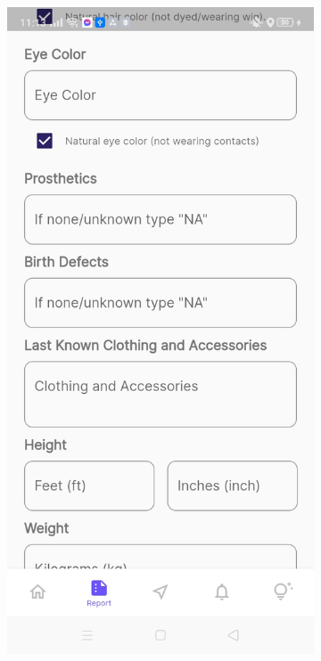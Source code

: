 \begin{figure}[!h]
\begin{subfigure}[c]{0.30\linewidth}
        \centering
        \includegraphics[scale=0.15]{figures/Chapter4/Main/p4-2.jpg}
    \end{subfigure}
    \centering
    \begin{subfigure}[c]{0.30\linewidth}

\end{subfigure}
\end{figure}
